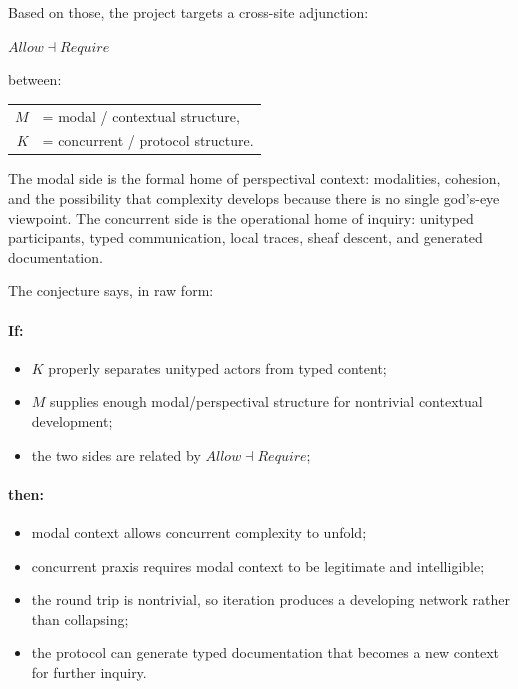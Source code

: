 \documentclass[11pt]{article}
\begin{document}
Based on those, the project targets a cross-site adjunction:

\begin{center}
\(Allow \dashv Require\)
\end{center}

between:

\begin{center}
\begin{tabular}{rl}
\(M\) &= modal / contextual structure,\\
\(K\) &= concurrent / protocol structure.
\end{tabular}
\end{center}

The modal side is the formal home of perspectival context: modalities,
cohesion, and the possibility that complexity develops because there is no
single god's-eye viewpoint. The concurrent side is the operational home of
inquiry: unityped participants, typed communication, local traces, sheaf
descent, and generated documentation.

The conjecture says, in raw form:

\paragraph{If:}
\begin{itemize}
\item \(K\) properly separates unityped actors from typed content;
\item \(M\) supplies enough modal/perspectival structure for nontrivial
contextual development;
\item the two sides are related by \(Allow \dashv Require\);
\end{itemize}

\paragraph{then:}
\begin{itemize}
\item modal context allows concurrent complexity to unfold;
\item concurrent praxis requires modal context to be legitimate and
intelligible;
\item the round trip is nontrivial, so iteration produces a developing network
rather than collapsing;
\item the protocol can generate typed documentation that becomes a new context
for further inquiry.
\end{itemize}
\end{document}
